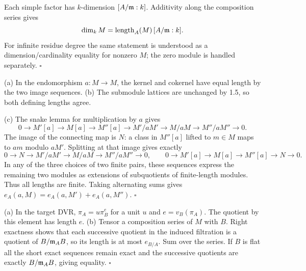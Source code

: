 \documentclass[11pt]{article}
\let\chapterexercise\exercise
\renewcommand{\exercise}[2]{\Needspace{8\baselineskip}\chapterexercise{#1}{#2}}
\begin{document}
Each simple factor has $k$-dimension $[A/\mathfrak m:k]$. Additivity along the composition series gives
\[ \dim_kM=\operatorname{length}_A(M)\,[A/\mathfrak m:k]. \]
For infinite residue degree the same statement is understood as a dimension/cardinality equality for nonzero $M$; the zero module is handled separately. \hfill$\square$

\pf
(a) In the endomorphism $a:M\to M$, the kernel and cokernel have equal length by the two image sequences. (b) The submodule lattices are unchanged by 1.5, so both defining lengths agree.

(c) The snake lemma for multiplication by $a$ gives
\[ 0\to M'[a]\to M[a]\to M''[a]\to M'/aM'\to M/aM\to M''/aM''\to0. \]
The image of the connecting map is $N$: a class in $M''[a]$ lifted to $m\in M$ maps to $am$ modulo $aM'$. Splitting at that image gives exactly
\[ 0\to N\to M'/aM'\to M/aM\to M''/aM''\to0,\qquad
0\to M'[a]\to M[a]\to M''[a]\to N\to0. \]
In any of the three choices of two finite pairs, these sequences express the remaining two modules as extensions of subquotients of finite-length modules. Thus all lengths are finite. Taking alternating sums gives $e_A(a,M)=e_A(a,M')+e_A(a,M'')$. \hfill$\square$

\pf
(a) In the target DVR, $\pi_A=u\pi_B^e$ for a unit $u$ and $e=v_B(\pi_A)$. The quotient by this element has length $e$. (b) Tensor a composition series of $M$ with $B$. Right exactness shows that each successive quotient in the induced filtration is a quotient of $B/\mathfrak m_AB$, so its length is at most $e_{B/A}$. Sum over the series. If $B$ is flat all the short exact sequences remain exact and the successive quotients are exactly $B/\mathfrak m_AB$, giving equality. \hfill$\square$
\end{document}
